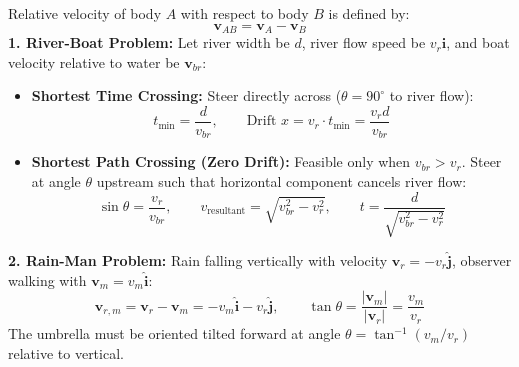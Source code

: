\documentclass[10pt,twoside,openright]{book}
\begin{document}
\begin{formulabox}
Relative velocity of body $A$ with respect to body $B$ is defined by:
\begin{equation}
  \mathbf{v}_{AB} = \mathbf{v}_A - \mathbf{v}_B
\end{equation}
\textbf{1. River-Boat Problem:} Let river width be $d$, river flow speed be $v_r\hat{\mathbf{i}}$, and boat velocity relative to water be $\mathbf{v}_{br}$:
\begin{itemize}
  \item \textbf{Shortest Time Crossing:} Steer directly across ($\theta = 90^\circ$ to river flow):
  \begin{equation}
    t_{\min} = \frac{d}{v_{br}}, \qquad \text{Drift } x = v_r \cdot t_{\min} = \frac{v_r d}{v_{br}}
  \end{equation}
  \item \textbf{Shortest Path Crossing (Zero Drift):} Feasible only when $v_{br} > v_r$. Steer at angle $\theta$ upstream such that horizontal component cancels river flow:
  \begin{equation}
    \sin\theta = \frac{v_r}{v_{br}}, \qquad v_{\text{resultant}} = \sqrt{v_{br}^2 - v_r^2}, \qquad t = \frac{d}{\sqrt{v_{br}^2 - v_r^2}}
  \end{equation}
\end{itemize}
\textbf{2. Rain-Man Problem:} Rain falling vertically with velocity $\mathbf{v}_r = -v_r\hat{\mathbf{j}}$, observer walking with $\mathbf{v}_m = v_m\hat{\mathbf{i}}$:
\begin{equation}
  \mathbf{v}_{r,m} = \mathbf{v}_r - \mathbf{v}_m = -v_m\hat{\mathbf{i}} - v_r\hat{\mathbf{j}}, \qquad \tan\theta = \frac{|\mathbf{v}_m|}{|\mathbf{v}_r|} = \frac{v_m}{v_r}
\end{equation}
The umbrella must be oriented tilted forward at angle $\theta = \tan^{-1}(v_m/v_r)$ relative to vertical.
\end{formulabox}
\end{document}
